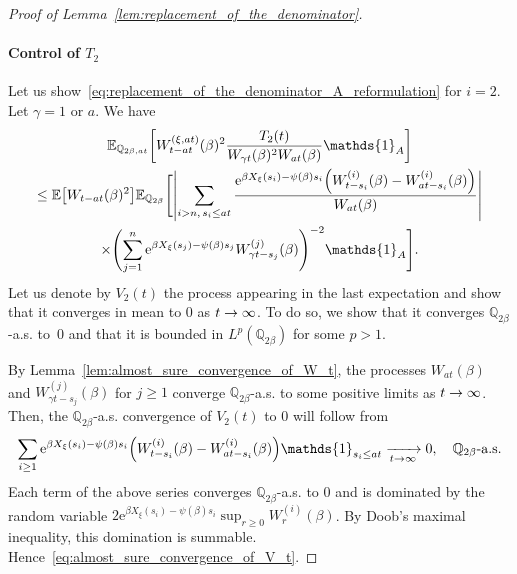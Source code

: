 \documentclass[AHL,Unicode,longabstracts,published]{cedram}
\newcommand{\e}{\mathrm{e}}
\newcommand{\E}{\mathbb{E}}
\newcommand{\Q}{\mathbb{Q}}
\newcommand\1{\mathds{1}}
\let\originalleft\left
\let\originalright\right
\renewcommand{\left}{\mathopen{}\mathclose\bgroup\originalleft}
\renewcommand{\right}{\aftergroup\egroup\originalright}
\renewcommand*{\to}{\mathchoice{\longrightarrow}{\rightarrow}{\rightarrow}{\rightarrow}}
\begin{document}
\begin{proof}[Proof of Lemma~\ref{lem:replacement_of_the_denominator}]
\paragraph*{Control of $T_2$} Let us show~\eqref{eq:replacement_of_the_denominator_A_reformulation} for $i = 2$. Let $\gamma = 1 \text{ or } a$. We have
\begin{multline*}
\E_{\Q_{2\beta, at}} \left[W_{t - at}^{(\xi, at)}(\beta)^2 \frac{T_2(t)}{W_{\gamma t}(\beta)^2 W_{at}(\beta)} \1_A \right]  \\
 \leq \E \left[W_{t - at}(\beta)^2 \right]\E_{\Q_{2\beta}} \Biggl[\left| \sum_{i > n,\, s_i \leq at} \frac{\e^{\beta X_\xi(s_i) - \psi(\beta)s_i} \left(W_{t - s_i}^{(i)}(\beta) - W_{at - s_i}^{(i)}(\beta)\right)}{W_{at}(\beta)} \right|  \\
\times \Biggl(\sum_{j = 1}^n \e^{\beta X_\xi(s_j) - \psi(\beta)s_j} W_{\gamma t - s_j}^{(j)}(\beta) \Biggr)^{-2} \1_A \Biggr]. 
\end{multline*}
Let us denote by $V_2(t)$ the process appearing in the last expectation and show that it converges in mean to $0$ as $t \to \infty$. To do so, we show that it converges $\Q_{2\beta}$-a.s. to~$0$ and that it is bounded in $L^p(\Q_{2\beta})$ for some $p > 1$.

By Lemma~\ref{lem:almost_sure_convergence_of_W_t}, the processes $W_{at}(\beta)$ and $W_{\gamma t - s_j}^{(j)}(\beta)$ for $j \geq 1$ converge $\Q_{2\beta}$-a.s. to some positive limits as $t \to \infty$. Then, the $\Q_{2\beta}$-a.s. convergence of $V_2(t)$ to $0$ will follow from
\begin{equation}\label{eq:almost_sure_convergence_of_V_t}
\sum_{i \geq 1} \e^{\beta X_\xi(s_i) - \psi(\beta)s_i} \left(W_{t - s_i}^{(i)}(\beta) - W_{at - s_i}^{(i)}(\beta)\right) \1_{s_i \leq at} \xrightarrow[t \to \infty]{} 0, \quad \text{$\Q_{2\beta}$-a.s.}
\end{equation}
Each term of the above series converges $\Q_{2\beta}$-a.s. to $0$ and is dominated by the random variable $2 \e^{\beta X_\xi(s_i) - \psi(\beta)s_i} \sup_{r \geq 0} W_r^{(i)}(\beta)$. By Doob's maximal inequality, this domination is summable. Hence~\eqref{eq:almost_sure_convergence_of_V_t}.


\end{proof}
\end{document}
